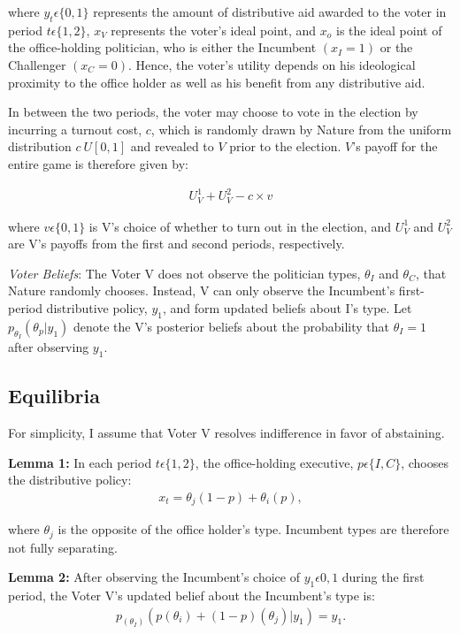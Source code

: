 \documentclass[12pt]{paper}
\begin{document}
where $y_t \epsilon \{0,1\}$ represents the amount of distributive aid awarded to the voter in period $t \epsilon \{1,2\}$, $x_V$ represents the voter’s ideal point, and $x_o$ is the ideal point of the office-holding politician, who is either the Incumbent $(x_I = 1)$ or the Challenger $(x_C = 0).$ Hence, the voter’s utility depends on his ideological proximity to the office holder as well as his benefit from any distributive aid.

In between the two periods, the voter may choose to vote in the election by incurring a turnout cost, $c$, which is randomly drawn by Nature from the uniform distribution $c~U[0,1]$ and revealed to $V$ prior to the election. $V$’s payoff for the entire game is therefore given by:

\begin{gather}
U_{V}^1 + U_{V}^2 - c \times v
\end{gather}

where $v \epsilon \{0,1\}$ is V’s choice of whether to turn out in the election, and $U_{V}^1$ and $U_{V}^2$ are V’s payoffs from the first and second periods, respectively.

\emph{Voter Beliefs}: The Voter V does not observe the politician types, $\theta_I$ and $\theta_C$, that Nature randomly chooses. Instead, V can only observe the Incumbent's first-period distributive policy,  $y_1$, and form updated beliefs about I’s type. Let $p_{\theta_I} (\theta_p | y_1 )$ denote the V’s posterior beliefs about the probability that $\theta_I = 1$ after observing $y_1$.

\subsection{Equilibria}
For simplicity, I assume that Voter V resolves indifference in favor of abstaining.
	
\textbf{Lemma 1:} In each period $t \epsilon \{1,2\}$, the office-holding executive, $p \epsilon \{I,C\}$, chooses the distributive policy: 
\begin{gather}
x_t=\theta_j (1-p)+ \theta_i (p), 
\end{gather}

where $\theta_j$ is the opposite of the office holder’s type. Incumbent types are therefore not fully separating.

\textbf{Lemma 2:}  After observing the Incumbent’s choice of $y_1 \epsilon {0,1}$ during the first period, the Voter V’s updated belief about the Incumbent’s type is: 
\begin{gather}
p_(\theta_I) (p(\theta_i ) + (1 - p)(\theta_j ) | y_1 )=y_1.
\end{gather}
\end{document}
